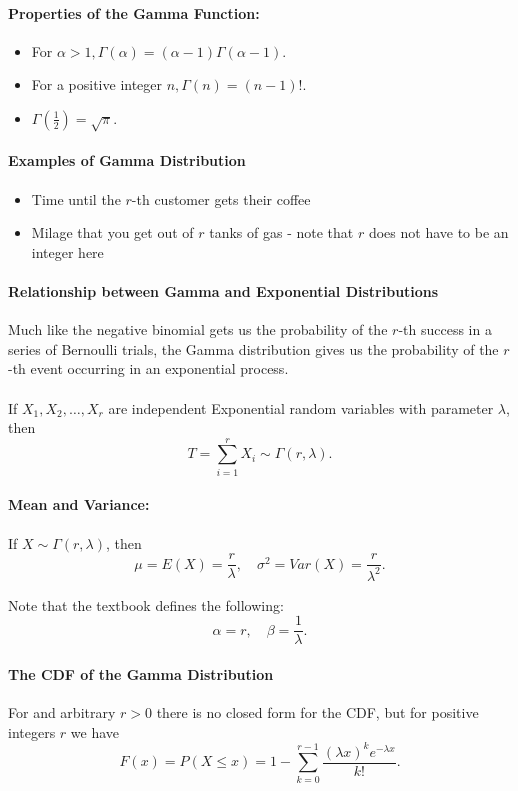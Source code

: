 \paragraph*{Properties of the Gamma Function:}
\begin{itemize}
    \item For $\alpha > 1, \Gamma(\alpha) = (\alpha - 1) \Gamma(\alpha - 1)$.
    \item For a positive integer $n, \Gamma(n) = (n-1)!$.
    \item $\Gamma\left(\frac{1}{2}\right) = \sqrt{\pi}$.
\end{itemize}

\paragraph*{Examples of Gamma Distribution}
\begin{itemize}
    \item Time until the $r$-th customer gets their coffee
    \item Milage that you get out of $r$ tanks of gas - note that $r$ does not have to be an integer here
\end{itemize}


\paragraph*{Relationship between Gamma and Exponential Distributions}
Much like the negative binomial gets us the probability of the $r$-th success in a series of Bernoulli trials, 
the Gamma distribution gives us the probability of the $r$-th event occurring in an exponential process.\\
\\
If $X_1, X_2, \ldots, X_r$ are independent Exponential random variables with parameter $\lambda$, then
\[
T = \sum_{i=1}^r X_i \sim \Gamma(r, \lambda).
\]

\paragraph*{Mean and Variance:} If $X \sim \Gamma(r, \lambda)$, then
\[\mu = E(X) = \frac{r}{\lambda}, \quad \sigma^2 = Var(X) = \frac{r}{\lambda^2}.\]

Note that the textbook defines the following:
\[ \alpha = r, \quad \beta = \frac{1}{\lambda}.\]

\paragraph*{The CDF of the Gamma Distribution}
For and arbitrary $r > 0$ there is no closed form for the CDF, but for positive integers $r$ we have
\[F(x) = P(X \leq x) = 1 - \sum_{k=0}^{r-1} \frac{(\lambda x)^k e^{-\lambda x}}{k!}.\]